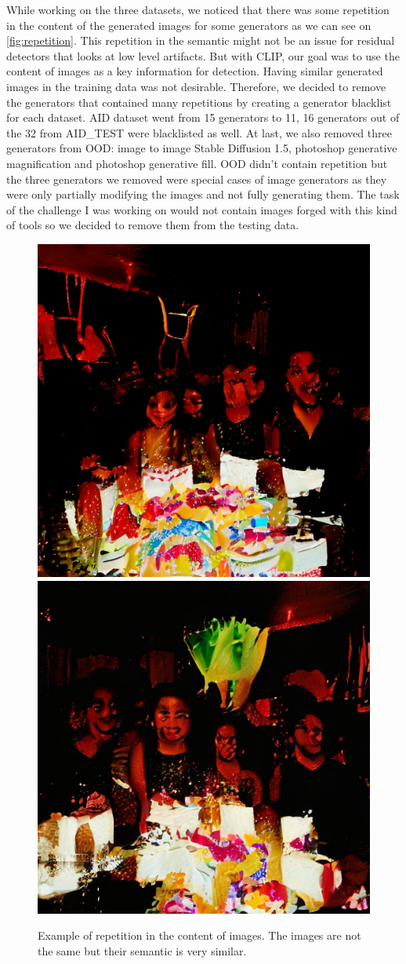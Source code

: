\documentclass[12pt,a4paper]{article}
\begin{document}
While working on the three datasets, we noticed that there was some repetition in the content of the generated images for some generators as we can see on \autoref{fig:repetition}. This repetition in the semantic might not be an issue for residual detectors that looks at low level artifacts. But with CLIP, our goal was to use the content of images as a key information for detection. Having similar generated images in the training data was not desirable. Therefore, we decided to remove the generators that contained many repetitions by creating a generator blacklist for each dataset. AID dataset went from 15 generators to 11, 16 generators out of the 32 from AID\_TEST were blacklisted as well. At last, we also removed three generators from OOD: image to image Stable Diffusion 1.5, photoshop generative magnification and photoshop generative fill. OOD didn't contain repetition but the three generators we removed were special cases of image generators as they were only partially modifying the images and not fully generating them. The task of the challenge I was working on would not contain images forged with this kind of tools so we decided to remove them from the testing data.

\begin{figure}[H]
    \centering
    \includegraphics[width=.49\textwidth]{img/birthday1.png}
    \includegraphics[width=.49\textwidth]{img/birthday2.png}
    \caption{Example of repetition in the content of images. The images are not the same but their semantic is very similar.}
    \label{fig:repetition}
\end{figure}
\end{document}
